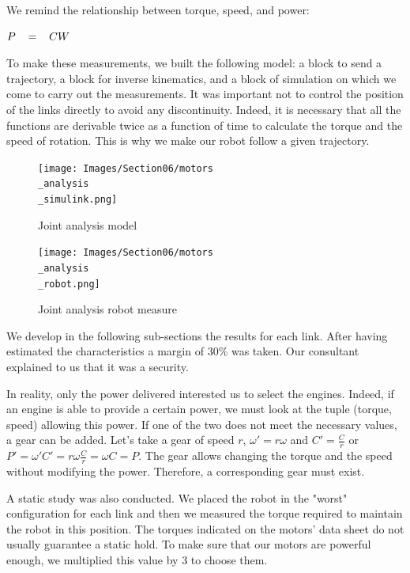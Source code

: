 We remind the relationship between torque, speed, and power: 
\begin{center}
    $P\hspace{0.3cm}=\hspace{0.3cm}CW$    
\end{center}

\bigbreak
To make these measurements, we built the following model: a block to send a trajectory, a block for inverse kinematics, and a block of simulation on which we come to carry out the measurements. It was important not to control the position of the links directly to avoid any discontinuity. Indeed, it is necessary that all the functions are derivable twice as a function of time to calculate the torque and the speed of rotation. This is why we make our robot follow a given trajectory.
\begin{figure}[ht]
    \centering
    \texttt{[image: Images/Section06/motors\\\_analysis\\\_simulink.png]}
    \caption{Joint analysis model}
    \label{fig:JointGlobalModel}
\end{figure}
\FloatBarrier

\begin{figure}[ht]
    \centering
    \texttt{[image: Images/Section06/motors\\\_analysis\\\_robot.png]}
    \caption{Joint analysis robot measure}
    \label{fig:JointRobotModel}
\end{figure}
\FloatBarrier

\bigbreak
We develop in the following sub-sections the results for each link. After having estimated the characteristics a margin of 30\% was taken. Our consultant explained to us that it was a security. 

\bigbreak
In reality, only the power delivered interested us to select the engines. Indeed, if an engine is able to provide a certain power, we must look at the tuple (torque, speed) allowing this power. If one of the two does not meet the necessary values, a gear can be added. Let's take a gear of speed $r$, $\omega'= r\omega$ and $C'= \frac{C}{r}$ or $P'= \omega'C'=r\omega\frac{C}{r} = \omega C = P$. The gear allows changing the torque and the speed without modifying the power. Therefore, a corresponding gear must exist.

\bigbreak
A static study was also conducted. We placed the robot in the "worst" configuration for each link and then we measured the torque required to maintain the robot in this position. The torques indicated on the motors' data sheet do not usually guarantee a static hold. To make sure that our motors are powerful enough, we multiplied this value by 3 to choose them. 

